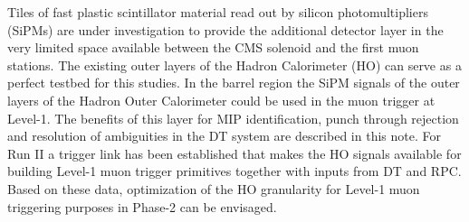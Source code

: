Tiles of fast plastic scintillator material read out by silicon photomultipliers (SiPMs) are under investigation to provide the additional detector layer in the very limited space available 
between the CMS solenoid and the first muon stations. The existing outer layers of the Hadron Calorimeter (HO)  can serve as a perfect testbed for this studies. In the barrel region the 
SiPM signals of the outer layers of the Hadron Outer Calorimeter could be used in the muon trigger at Level-1. The benefits of this layer for MIP identification, punch through rejection 
and resolution of ambiguities in the DT system are described in this note. For Run II a trigger link has been established that makes the HO signals available for building Level-1 muon 
trigger primitives together with inputs from DT and RPC. Based on these data, optimization of the HO granularity for Level-1 muon triggering purposes in Phase-2 can be envisaged. 

